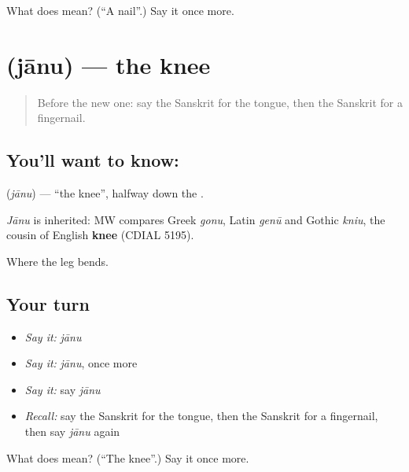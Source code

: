 \begin{tcolorbox}[breakable,colback=teal!4,colframe=teal!35!black,title={Before you move on}]
What does  mean? (\textquotedblleft{}A nail\textquotedblright{}.) Say it once more.
\end{tcolorbox}
\section[\texorpdfstring{\sk{जानु} (jānu)}{जानु (jānu)}]{ (jānu) — the knee}

\label{lesson:SA-C70-knee}



\begin{quote}
Before the new one: say the Sanskrit for the tongue, then the Sanskrit for a fingernail.
\end{quote}

\subsection*{You'll want to know: }
\textbf{} (\emph{jānu}) — \textquotedblleft{}the knee\textquotedblright{}, halfway down the \textbf{}.

\begin{cousinweb}
\emph{Jānu} is inherited: MW compares Greek \emph{gonu}, Latin \emph{genū} and Gothic \emph{kniu}, the cousin of English \textbf{knee} (CDIAL 5195).
\end{cousinweb}

\begin{grammarlens}[title={What you've built}]
Where the leg bends.
\end{grammarlens}

\subsection*{Your turn}
\begin{itemize}
\raggedright
  \item \emph{Say it:} \emph{jānu}
  \item \emph{Say it:} \emph{jānu}, once more
  \item \emph{Say it:} say \emph{jānu}
  \item \emph{Recall:} say the Sanskrit for the tongue, then the Sanskrit for a fingernail, then say \emph{jānu} again
\end{itemize}

\begin{tcolorbox}[breakable,colback=teal!4,colframe=teal!35!black,title={Before you move on}]
What does  mean? (\textquotedblleft{}The knee\textquotedblright{}.) Say it once more.
\end{tcolorbox}
